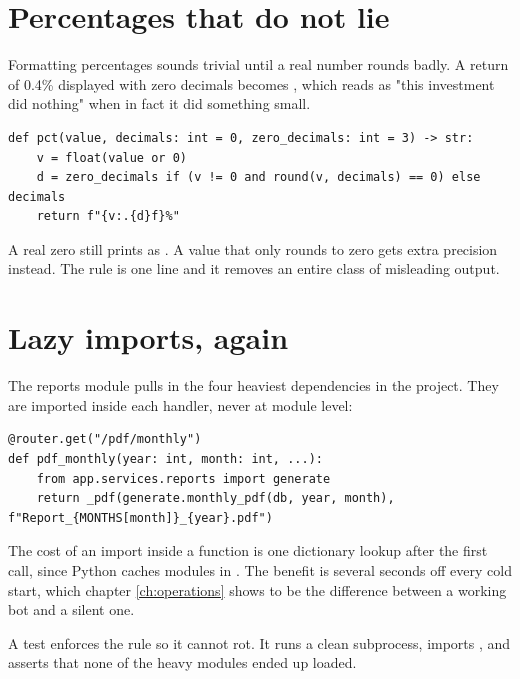 \section{Percentages that do not lie}

Formatting percentages sounds trivial until a real number rounds badly. A return
of 0.4\% displayed with zero decimals becomes , which reads as "this
investment did nothing" when in fact it did something small.

\begin{lstlisting}[style=py]
def pct(value, decimals: int = 0, zero_decimals: int = 3) -> str:
    v = float(value or 0)
    d = zero_decimals if (v != 0 and round(v, decimals) == 0) else decimals
    return f"{v:.{d}f}%"
\end{lstlisting}

A real zero still prints as . A value that only rounds to zero gets
extra precision instead. The rule is one line and it removes an entire class of
misleading output.

\section{Lazy imports, again}

The reports module pulls in the four heaviest dependencies in the project.
They are imported inside each handler, never at module level:

\begin{lstlisting}[style=py]
@router.get("/pdf/monthly")
def pdf_monthly(year: int, month: int, ...):
    from app.services.reports import generate
    return _pdf(generate.monthly_pdf(db, year, month), f"Report_{MONTHS[month]}_{year}.pdf")
\end{lstlisting}

The cost of an import inside a function is one dictionary lookup after the first
call, since Python caches modules in . The benefit is several
seconds off every cold start, which chapter \ref{ch:operations} shows to be the
difference between a working bot and a silent one.

A test enforces the rule so it cannot rot. It runs a clean subprocess, imports
, and asserts that none of the heavy modules ended up loaded.
